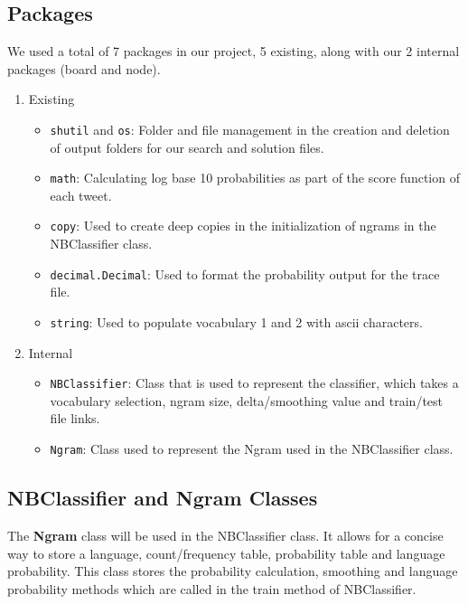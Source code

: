 \documentclass[runningheads]{llncs}
\begin{document}
\subsection{Packages}

We used a total of 7 packages in our project, 5 existing, along with our 2 internal packages (board and node).

\begin{enumerate}
    \item Existing
    \begin{itemize}
        \item \verb|shutil| and \verb|os|: Folder and file management in the creation and deletion of output folders for our search and solution files.
        \item \verb|math|: Calculating log base 10 probabilities as part of the score function of each tweet.
        \item \verb|copy|: Used to create deep copies in the initialization of ngrams in the NBClassifier class.
        \item \verb|decimal.Decimal|: Used to format the probability output for the trace file.
        \item \verb|string|: Used to populate vocabulary 1 and 2 with ascii characters.
    \end{itemize}
    \item Internal
    \begin{itemize}
        \item \verb|NBClassifier|: Class that is used to represent the classifier, which takes a vocabulary selection, ngram size, delta/smoothing value and train/test file links.
        \item \verb|Ngram|: Class used to represent the Ngram used in the NBClassifier class.
    \end{itemize}
\end{enumerate}

\subsection{NBClassifier and Ngram Classes}

The \textbf{Ngram} class will be used in the NBClassifier class. It allows for a concise way to store a language, count/frequency table, probability table and language probability. This class stores the probability calculation, smoothing and language probability methods which are called in the train method of NBClassifier.
\end{document}
